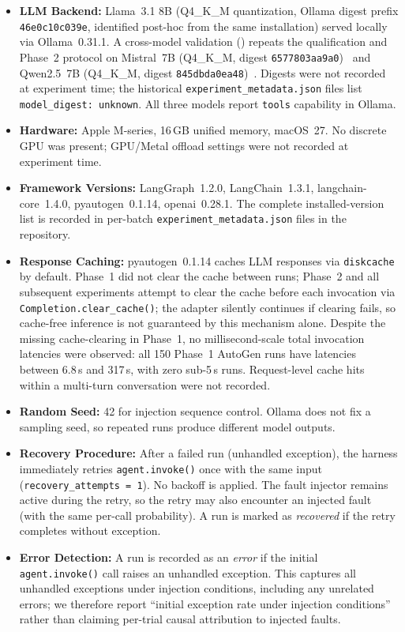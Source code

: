 \documentclass[make,article,submit,moreauthors,pdftex]{mdpi}
\begin{document}
\begin{itemize}
  \item \textbf{LLM Backend:} Llama~3.1 8B (Q4\_K\_M quantization, Ollama digest prefix \texttt{46e0c10c039e}, identified post-hoc from the same installation) served locally via Ollama~0.31.1. A cross-model validation () repeats the qualification and Phase~2 protocol on Mistral~7B (Q4\_K\_M, digest \texttt{6577803aa9a0})~\cite{mistral2024} and Qwen2.5~7B (Q4\_K\_M, digest \texttt{845dbda0ea48})~\cite{qwen25_2024}. Digests were not recorded at experiment time; the historical \texttt{experiment\_metadata.json} files list \texttt{model\_digest:~unknown}. All three models report \texttt{tools} capability in Ollama.
  \item {\color{blue}\textbf{Hardware:} Apple M-series, 16\,GB unified memory, macOS~27. No discrete GPU was present; GPU/Metal offload settings were not recorded at experiment time.}
  \item {\color{blue}\textbf{Framework Versions:} LangGraph~1.2.0, LangChain~1.3.1, langchain-core~1.4.0, pyautogen~0.1.14, openai~0.28.1. The complete installed-version list is recorded in per-batch \texttt{experiment\_metadata.json} files in the repository.}
  \item \textbf{Response Caching:} pyautogen~0.1.14 caches LLM responses via \texttt{diskcache} by default. {\color{orange}Phase~1 did not clear the cache between runs; Phase~2 and all subsequent experiments attempt to clear the cache before each invocation via \texttt{Completion.clear\_cache()}; the adapter silently continues if clearing fails, so cache-free inference is not guaranteed by this mechanism alone. Despite the missing cache-clearing in Phase~1, no millisecond-scale total invocation latencies were observed: all 150 Phase~1 AutoGen runs have latencies between 6.8\,s and 317\,s, with zero sub-5\,s runs. Request-level cache hits within a multi-turn conversation were not recorded.}
  \item \textbf{Random Seed:} 42 for injection sequence control. Ollama does not fix a sampling seed, so repeated runs produce different model outputs.
  \item \textbf{Recovery Procedure:} After a failed run (unhandled exception), the harness immediately retries \texttt{agent.invoke()} once with the same input (\texttt{recovery\_attempts\,=\,1}). No backoff is applied. The fault injector remains active during the retry, so the retry may also encounter an injected fault (with the same per-call probability). A run is marked as \emph{recovered} if the retry completes without exception.
  \item \textbf{Error Detection:} A run is recorded as an \emph{error} if the initial \texttt{agent.invoke()} call raises an unhandled exception. This captures all unhandled exceptions under injection conditions, including any unrelated errors; we therefore report ``initial exception rate under injection conditions'' rather than claiming per-trial causal attribution to injected faults.
\end{itemize}
\end{document}
